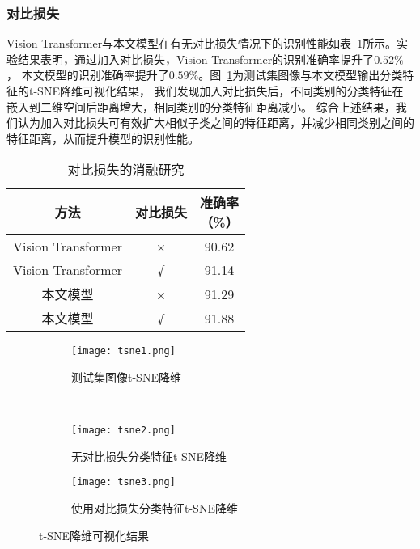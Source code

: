 \subsubsection{对比损失}
Vision Transformer与本文模型在有无对比损失情况下的识别性能如表~\ref{table:con_loss}所示。实验结果表明，通过加入对比损失，Vision Transformer的识别准确率提升了$0.52\%$，
本文模型的识别准确率提升了$0.59\%$。图~\ref{fig:tsne}为测试集图像与本文模型输出分类特征的t-SNE\cite{van2008visualizing}降维可视化结果，
我们发现加入对比损失后，不同类别的分类特征在嵌入到二维空间后距离增大，相同类别的分类特征距离减小。
综合上述结果，我们认为加入对比损失可有效扩大相似子类之间的特征距离，并减少相同类别之间的特征距离，从而提升模型的识别性能。

\begin{table}
  \caption{对比损失的消融研究}   
  \centering 
  \label{table:con_loss}
  \begin{tabular}{ccc}
    \toprule[2pt]
    方法 & 对比损失 & \makecell{准确率 \\（\%）} \\
    \midrule[1.5pt] 
        Vision Transformer & × & 90.62  \\ 
        Vision Transformer & √ & 91.14  \\ 
        本文模型 & × & 91.29  \\ 
        本文模型 & √ & 91.88  \\ 
    \bottomrule[2pt]      
  \end{tabular} 
\end{table}

\begin{figure}[htbp]
	\centering
  \begin{subfigure}{0.45\linewidth}
    \centering
    \texttt{[image: tsne1.png]}
    \caption{测试集图像t-SNE降维}
  \end{subfigure}
  \\
	\centering
	\begin{subfigure}{0.45\linewidth}
		\centering
		\texttt{[image: tsne2.png]}
    \caption{无对比损失分类特征t-SNE降维}
	\end{subfigure}
	\centering
	\begin{subfigure}{0.45\linewidth}
		\centering
		\texttt{[image: tsne3.png]}
    \caption{使用对比损失分类特征t-SNE降维}
	\end{subfigure}
  \caption{t-SNE降维可视化结果}
	\label{fig:tsne}
\end{figure}

